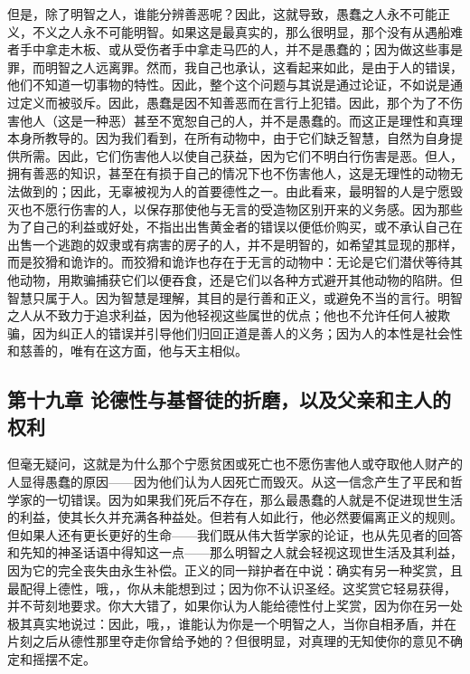 但是，除了明智之人，谁能分辨善恶呢？因此，这就导致，愚蠢之人永不可能正义，不义之人永不可能明智。如果这是最真实的，那么很明显，那个没有从遇船难者手中拿走木板、或从受伤者手中拿走马匹的人，并不是愚蠢的；因为做这些事是罪，而明智之人远离罪。然而，我自己也承认，这看起来如此，是由于人的错误，他们不知道一切事物的特性。因此，整个这个问题与其说是通过论证，不如说是通过定义而被驳斥。因此，愚蠢是因不知善恶而在言行上犯错。因此，那个为了不伤害他人（这是一种恶）甚至不宽恕自己的人，并不是愚蠢的。而这正是理性和真理本身所教导的。因为我们看到，在所有动物中，由于它们缺乏智慧，自然为自身提供所需。因此，它们伤害他人以使自己获益，因为它们不明白行伤害是恶。但人，拥有善恶的知识，甚至在有损于自己的情况下也不伤害他人，这是无理性的动物无法做到的；因此，无辜被视为人的首要德性之一。由此看来，最明智的人是宁愿毁灭也不愿行伤害的人，以保存那使他与无言的受造物区别开来的义务感。因为那些为了自己的利益或好处，不指出出售黄金者的错误以便低价购买，或不承认自己在出售一个逃跑的奴隶或有病害的房子的人，并不是明智的，如希望其显现的那样，而是狡猾和诡诈的。而狡猾和诡诈也存在于无言的动物中：无论是它们潜伏等待其他动物，用欺骗捕获它们以便吞食，还是它们以各种方式避开其他动物的陷阱。但智慧只属于人。因为智慧是理解，其目的是行善和正义，或避免不当的言行。明智之人从不致力于追求利益，因为他轻视这些属世的优点；他也不允许任何人被欺骗，因为纠正人的错误并引导他们归回正道是善人的义务；因为人的本性是社会性和慈善的，唯有在这方面，他与天主相似。\par


\subsection{第十九章 论德性与基督徒的折磨，以及父亲和主人的权利}

但毫无疑问，这就是为什么那个宁愿贫困或死亡也不愿伤害他人或夺取他人财产的人显得愚蠢的原因——因为他们认为人因死亡而毁灭。从这一信念产生了平民和哲学家的一切错误。因为如果我们死后不存在，那么最愚蠢的人就是不促进现世生活的利益，使其长久并充满各种益处。但若有人如此行，他必然要偏离正义的规则。但如果人还有更长更好的生命——我们既从伟大哲学家的论证，也从先见者的回答和先知的神圣话语中得知这一点——那么明智之人就会轻视这现世生活及其利益，因为它的完全丧失由永生补偿。正义的同一辩护者在中说：确实有另一种奖赏，且最配得上德性，哦，，你从未能想到过；因为你不认识圣经。这奖赏它轻易获得，并不苛刻地要求。你大大错了，如果你认为人能给德性付上奖赏，因为你在另一处极其真实地说过：因此，哦，，谁能认为你是一个明智之人，当你自相矛盾，并在片刻之后从德性那里夺走你曾给予她的？但很明显，对真理的无知使你的意见不确定和摇摆不定。\par

